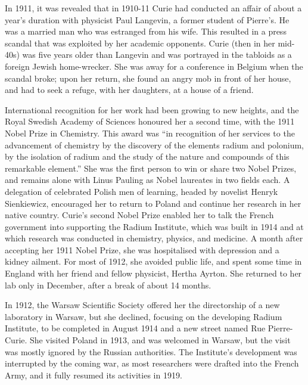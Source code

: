 \documentclass[12pt,a4paper]{article}
\begin{document}
In 1911, it was revealed that in 1910-11 Curie had conducted an affair of about a year's duration with physicist Paul Langevin, a former student of Pierre's. He was a married man who was estranged from his wife. This resulted in a press scandal that was exploited by her academic opponents. Curie (then in her mid-40s) was five years older than Langevin and was portrayed in the tabloids as a foreign Jewish home-wrecker. She was away for a conference in Belgium when the scandal broke; upon her return, she found an angry mob in front of her house, and had to seek a refuge, with her daughters, at a house of a friend.

International recognition for her work had been growing to new heights, and the Royal Swedish Academy of Sciences honoured her a second time, with the 1911 Nobel Prize in Chemistry. This award was ``in recognition of her services to the advancement of chemistry by the discovery of the elements radium and polonium, by the isolation of radium and the study of the nature and compounds of this remarkable element.'' She was the first person to win or share two Nobel Prizes, and remains alone with Linus Pauling as Nobel laureates in two fields each. A delegation of celebrated Polish men of learning, headed by novelist Henryk Sienkiewicz, encouraged her to return to Poland and continue her research in her native country. Curie's second Nobel Prize enabled her to talk the French government into supporting the Radium Institute, which was built in 1914 and at which research was conducted in chemistry, physics, and medicine. A month after accepting her 1911 Nobel Prize, she was hospitalised with depression and a kidney ailment. For most of 1912, she avoided public life, and spent some time in England with her friend and fellow physicist, Hertha Ayrton. She returned to her lab only in December, after a break of about 14 months.

In 1912, the Warsaw Scientific Society offered her the directorship of a new laboratory in Warsaw, but she declined, focusing on the developing Radium Institute, to be completed in August 1914 and a new street named Rue Pierre-Curie. She visited Poland in 1913, and was welcomed in Warsaw, but the visit was mostly ignored by the Russian authorities. The Institute's development was interrupted by the coming war, as most researchers were drafted into the French Army, and it fully resumed its activities in 1919.
\end{document}
